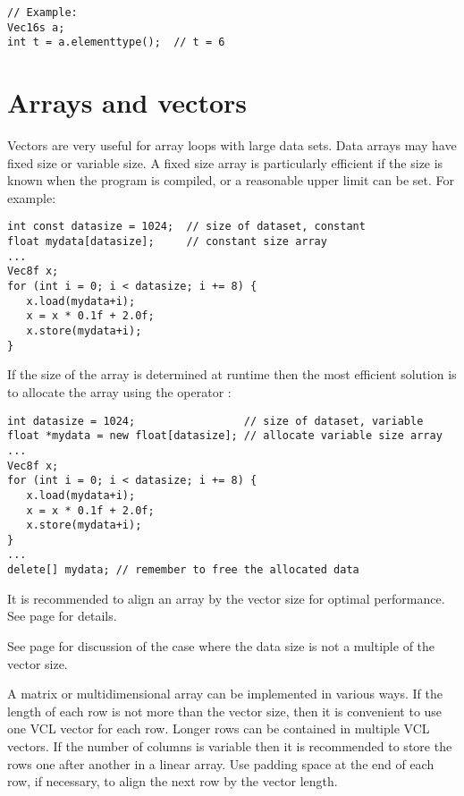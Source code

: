 \documentclass[vcl_manual.tex]{subfiles}
\begin{document}
\begin{lstlisting}[frame=none]
// Example:
Vec16s a;
int t = a.elementtype();  // t = 6
\end{lstlisting}


{}


\section{Arrays and vectors} \label{ArraysOfVectors}
Vectors are very useful for array loops with large data sets. Data arrays may have fixed size or variable size. A fixed size array is particularly efficient if the size is known when the program is compiled, or a reasonable upper limit can be set. For example:

\begin{lstlisting}[frame=none]
int const datasize = 1024;  // size of dataset, constant
float mydata[datasize];     // constant size array
...
Vec8f x;
for (int i = 0; i < datasize; i += 8) {
   x.load(mydata+i);
   x = x * 0.1f + 2.0f;
   x.store(mydata+i);
}
\end{lstlisting}

If the size of the array is determined at runtime then the most efficient solution is to allocate the array using the operator :

\begin{lstlisting}[frame=none]
int datasize = 1024;                 // size of dataset, variable
float *mydata = new float[datasize]; // allocate variable size array
...
Vec8f x;
for (int i = 0; i < datasize; i += 8) {
   x.load(mydata+i);
   x = x * 0.1f + 2.0f;
   x.store(mydata+i);
}
...
delete[] mydata; // remember to free the allocated data
\end{lstlisting}

It is recommended to align an array by the vector size for optimal performance. See page \pageref{Alignment} for details.

See page \pageref{NotAMultipleOfVectorSize} for discussion of the case where the data size is not a multiple of the vector size.

A matrix or multidimensional array can be implemented in various ways. If the length of each row is not more than the vector size, then it is convenient to use one VCL vector for each row. Longer rows can be contained in multiple VCL vectors. If the number of columns is variable then it is recommended to store the rows one after another in a linear array. Use padding space at the end of each row, if necessary, to align the next row by the vector length. 
\end{document}
